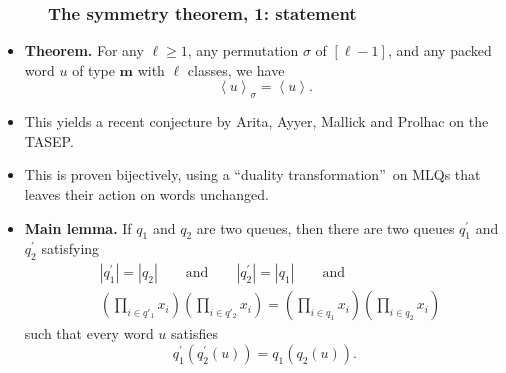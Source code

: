 \documentclass{beamer}
\newcommand{\fti}[1]{\frametitle{\ \ \ \ \ #1}}
\newcommand{\tup}[1]{\left( #1 \right)}
\theoremstyle{plain}
\newcommand{\0}{\phantom{c}}
\let\prodnonlimits\prod
\renewcommand{\prod}{\prodnonlimits\limits}
\begin{document}
\begin{frame}
\fti{The symmetry theorem, 1: statement}

\begin{itemize}
\item \textbf{Theorem.} For any $\ell\geq1$, any permutation $\sigma$ of
$\left[  \ell-1\right]  $, and any packed word $u$ of type $\mathbf{m}$ with
$\ell$ classes, we have
\[
\left\langle u\right\rangle _{\sigma}=\left\langle u\right\rangle .
\]

\pause
\item This yields a recent conjecture by Arita, Ayyer, Mallick
and Prolhac on the TASEP.

\pause
\item This is proven bijectively, using a \textquotedblleft duality
transformation\textquotedblright\ on MLQs that leaves their action on words unchanged.

\item \textbf{Main lemma.} If $q_{1}$ and $q_{2}$ are two queues, then there
are two queues $q_{1}^{\prime}$ and $q_{2}^{\prime}$ satisfying
\begin{align*}
&\left\vert q_{1}^{\prime}\right\vert =\left\vert q_{2}\right\vert
\qquad\text{and}\qquad\left\vert q_{2}^{\prime}\right\vert =\left\vert
q_{1}\right\vert \qquad \text{and} \\
& \tup{\prod_{i \in q'_1} x_i} \tup{\prod_{i \in q'_2} x_i}
  = \tup{\prod_{i \in q_1} x_i} \tup{\prod_{i \in q_2} x_i}
\end{align*}
such that every word $u$ satisfies%
\[
q_{1}^{\prime}\left(  q_{2}^{\prime}\left(  u\right)  \right)  =q_{1}\left(
q_{2}\left(  u\right)  \right)  .
\]

\end{itemize}
\vspace{10cm}
\end{frame}
\end{document}
